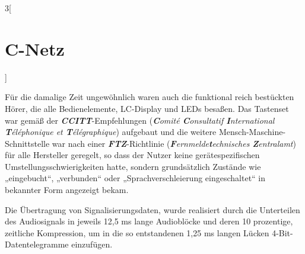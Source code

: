 \begin{multicols}{3}[\section{C-Netz}]
\begin{Figure}
\label{fig:c-netz.mobiltelefonEins}
\end{Figure}
Für die damalige Zeit ungewöhnlich waren auch die funktional reich bestückten Hörer, die alle Bedienelemente, LC-Display und LEDs besaßen. 
Das Tastenset war gemäß der \textit{\textbf{CCITT}}-Empfehlungen (\textit{\textbf{C}omité \textbf{C}onsultatif \textbf{I}nternational \textbf{T}éléphonique et \textbf{T}élégraphique}) aufgebaut und die weitere Mensch-Maschine-Schnittstelle war nach einer \textit{\textbf{FTZ}}-Richtlinie (\textit{\textbf{F}ernmelde\textbf{t}echnisches \textbf{Z}entralamt}) für alle Hersteller geregelt, so dass der Nutzer keine gerätespezifischen Umstellungsschwierigkeiten hatte, sondern grundsätzlich Zustände wie „eingebucht“, „verbunden“ oder „Sprachverschleierung eingeschaltet“ in bekannter Form angezeigt bekam.

Die Übertragung von Signalisierungsdaten, wurde realisiert durch die Unterteilen des Audiosignals in jeweils 12,5 ms lange Audioblöcke und deren 10 prozentige, zeitliche Kompression, um in die so entstandenen 1,25 ms langen Lücken 4-Bit-Datentelegramme einzufügen.




\end{multicols}
